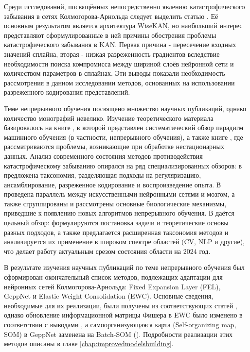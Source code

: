 \documentclass[a4paper,14pt]{extarticle}
\begin{document}
Среди исследований, посвящённых непосредственно явлению
катастрофического забывания в сетях Колмогорова-Арнольда следует выделить статью
\cite{lee2025kolmogorov}. Её основным результатом является архитектура WiseKAN,
но наибольший интерес представляют сформулированные в ней причины обострения
проблемы катастрофического забывания в KAN. Первая причина - пересечение входных
значений сплайна, вторая - низкая разреженность  градиентов вследствие
необходимости поиска компромисса между шириной слоёв нейронной сети и
количеством параметров в сплайнах. Эти выводы показали необходимость
рассмотрения в данном исследовании методов, основанных на использовании
разреженного кодирования представлений. 

Теме непрерывного обучения посвящено множество научных публикаций, однако
количество монографий невелико. Изучение теоретического материала базировалось
на книге \cite{lifelongmachinelearning}, в которой представлен систематический
обзор парадигм машинного обучения (в частности, непрерывного обучения), а также
книге \cite{machinelearningfordatastreams}, где рассматриваются проблемы,
возникающие при обработке нестационарных данных. Анализ современного состояния
методов противодействия катастрофическому забыванию опирался на ряд
специализированных обзоров: в \cite{kemker2017measuring} предложена таксономия,
разделяющая подходы на регуляризацию, ансамблирование, разреженное кодирование и
воспроизведение опыта. В \cite{parisi2018continual} проведена параллель между
искусственными нейронными сетями и мозгом, а также сгруппированы и рассмотрены
основные биологические механизмы, приведшие к появлению новых алгоритмов
непрерывного обучения. В \cite{wang2024comprehensive} даётся цельный обзор:
формулируются постановка задачи и теоретические основы разных подходов, а также
предлагается расширенная таксономия методов и анализируется их применение в
широком спектре областей (CV, NLP и другие), что делает работу актуальным срезом
состояния области на 2024 год.

В результате изучения научных публикаций по теме непрерывного обучения был
сформирован окончательный список методов, подлежащих адаптации для нейронных
сетей Колмогорова-Арнольда: Fixed Expansion Layer (FEL), GeppNet и Elastic
Weight Consolidation (EWC). Основные сведения, необходимые для их реализации,
были получены из соответствующих статей
\cite{kirkpatrick2017overcoming,coop2013ensemble,gepperth2016bioinspired},
однако обновление информационной матрицы Фишера в EWC было изменено в
соответствии с выводами \cite{schwarz2018progress}, а самоорганизующаяся карта
(Self-organizing map, SOM) в GeppNet заменена на Batch-SOM
(\cite{cheng1997convergence}). Подробности реализации этих методов описаны в
главе \ref{chap:improvedmodelsbuilding}.
\pagebreak
\end{document}
